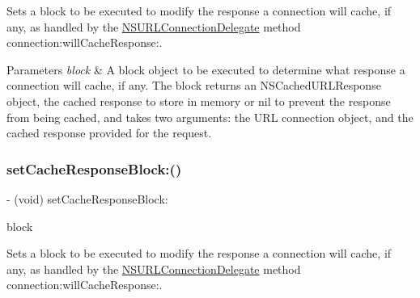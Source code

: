 Sets a block to be executed to modify the response a connection will cache, if any, as handled by the {\ttfamily \mbox{\hyperlink{class_n_s_u_r_l_connection_delegate-p}{N\+S\+U\+R\+L\+Connection\+Delegate}}} method {\ttfamily connection\+:will\+Cache\+Response\+:}.


\begin{DoxyParams}{Parameters}
{\em block} & A block object to be executed to determine what response a connection will cache, if any. The block returns an {\ttfamily N\+S\+Cached\+U\+R\+L\+Response} object, the cached response to store in memory or {\ttfamily nil} to prevent the response from being cached, and takes two arguments\+: the U\+RL connection object, and the cached response provided for the request. \\
\hline
\end{DoxyParams}
\mbox{\label{interface_a_f_u_r_l_connection_operation_a1de158a5fe7e2e45c6fc901a59870b28}} 
\subsubsection{\texorpdfstring{set\+Cache\+Response\+Block\+:()}{setCacheResponseBlock:()}\hspace{0.1cm}{\footnotesize\ttfamily [2/3]}}
{\footnotesize\ttfamily -\/ (void) set\+Cache\+Response\+Block\+: \begin{DoxyParamCaption}\item[{(nullable N\+S\+Cached\+U\+R\+L\+Response $\ast$($^\wedge$)(N\+S\+U\+R\+L\+Connection $\ast$connection, N\+S\+Cached\+U\+R\+L\+Response $\ast$cached\+Response))}]{block }\end{DoxyParamCaption}}

Sets a block to be executed to modify the response a connection will cache, if any, as handled by the {\ttfamily \mbox{\hyperlink{class_n_s_u_r_l_connection_delegate-p}{N\+S\+U\+R\+L\+Connection\+Delegate}}} method {\ttfamily connection\+:will\+Cache\+Response\+:}.


